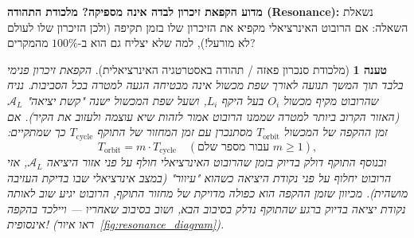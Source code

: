\documentclass[11pt, a4paper]{article}
\newtheorem{proposition}{טענה}
\begin{document}
\noindent\textbf{מדוע הקפאת זיכרון לבדה אינה מספיקה? מלכודת התהודה (\foreignlanguage{english}{Resonance}):}
נשאלת השאלה: אם הרובוט האינרציאלי מקפיא את הזיכרון שלו בזמן תקיפה (ולכן הזיכרון שלו לעולם לא מורעל!), למה שלא יצליח גם הוא ב-$100\%$ מהמקרים?

\begin{proposition}[מלכודת סנכרון פאזה / תהודה באסטרטגיה האינרציאלית]
\label{prop:resonance}
הקפאת זיכרון פנימי בלבד תוך המשך תנועה לאורך שפת מכשול אינה מבטיחה הגעה למטרה בכל הסביבות. נניח שהרובוט מקיף מכשול $O_i$ בעל היקף $L_i$, ושעל שפת המכשול ישנה "קשת יציאה" $\mathcal{A}_L$ (האזור הקרוב ביותר למטרה שממנו הרובוט אמור לזהות שיא עוצמה ולעזוב את הקיר). אם זמן ההקפה של המכשול $T_{\text{orbit}}$ מסתנכרן עם זמן המחזור של התוקף $T_{\text{cycle}}$ כך שמתקיים:
\begin{equation*}
    T_{\text{orbit}} = m \cdot T_{\text{cycle}} \quad (\text{עבור מספר שלם } m \ge 1),
\end{equation*}
ובנוסף התוקף דולק בדיוק בזמן שהרובוט האינרציאלי חולף על פני אזור היציאה $\mathcal{A}_L$, אזי הרובוט יחלוף על פני נקודת היציאה כשהוא "עיוור" (במצב אינרציאלי שבו בדיקת העזיבה מושהית). מכיוון שזמן ההקפה הוא כפולה מדויקת של מחזור התוקף, הרובוט יגיע שוב לאותה נקודת יציאה בדיוק ברגע שהתוקף נדלק בסיבוב הבא, ושוב בסיבוב שאחריו — ויילכד בהקפה אינסופית! (ראו איור~\ref{fig:resonance_diagram}).
\end{proposition}
\end{document}
